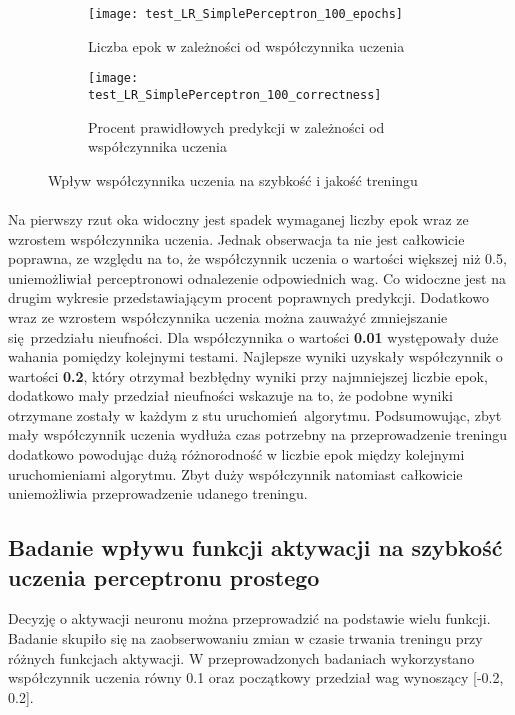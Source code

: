 \documentclass[\main/main.tex]{subfiles}
\begin{document}
    \begin{figure}[H]
    \centering
    \begin{subfigure}{.5\textwidth}
    \centering
    \texttt{[image: test\_LR\_SimplePerceptron\_100\_epochs]}
    \caption{Liczba epok w zależności od współczynnika uczenia}
    \label{fig:lr_sp_epochs}
    \end{subfigure}%
    \begin{subfigure}{.5\textwidth}
    \centering
    \texttt{[image: test\_LR\_SimplePerceptron\_100\_correctness]}
    \caption{Procent prawidłowych predykcji w zależności od współczynnika uczenia}
    \label{fig:lr_sp_correctness}
    \end{subfigure}
    \caption{Wpływ współczynnika uczenia na szybkość i jakość treningu}
    \label{fig:test}
    \end{figure}
    
    \paragraph{}
    Na pierwszy rzut oka widoczny jest spadek wymaganej liczby epok wraz ze wzrostem współczynnika uczenia. Jednak obserwacja ta nie jest całkowicie poprawna, ze względu na to, że współczynnik uczenia o wartości większej niż 0.5, uniemożliwiał perceptronowi odnalezenie odpowiednich wag. Co widoczne jest na drugim wykresie przedstawiającym procent poprawnych predykcji. Dodatkowo wraz ze wzrostem współczynnika uczenia można zauważyć zmniejszanie się przedziału nieufności. Dla współczynnika o wartości \textbf{0.01} występowały duże wahania pomiędzy kolejnymi testami. Najlepsze wyniki uzyskały współczynnik o wartości \textbf{0.2}, który otrzymał bezbłędny wyniki przy najmniejszej liczbie epok, dodatkowo mały przedział nieufności wskazuje na to, że podobne wyniki otrzymane zostały w każdym z stu uruchomień algorytmu. Podsumowując, zbyt mały współczynnik uczenia wydłuża czas potrzebny na przeprowadzenie treningu dodatkowo powodując dużą różnorodność w liczbie epok między kolejnymi uruchomieniami algorytmu. Zbyt duży współczynnik natomiast całkowicie uniemożliwia przeprowadzenie udanego treningu.
    
    \subsection{Badanie wpływu funkcji aktywacji na szybkość uczenia perceptronu prostego}
    Decyzję o aktywacji neuronu można przeprowadzić na podstawie wielu funkcji. Badanie skupiło się na zaobserwowaniu zmian w czasie trwania treningu przy różnych funkcjach aktywacji. W przeprowadzonych badaniach wykorzystano współczynnik uczenia równy 0.1 oraz początkowy przedział wag wynoszący [-0.2, 0.2].
    
\end{document}

